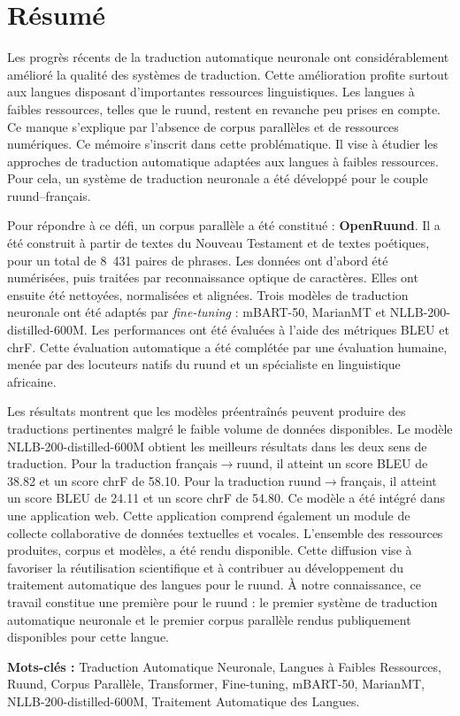 
\chapter*{Résumé}
Les progrès récents de la traduction automatique neuronale ont considérablement amélioré la qualité des systèmes de traduction. Cette amélioration profite surtout aux langues disposant d'importantes ressources linguistiques. Les langues à faibles ressources, telles que le ruund, restent en revanche peu prises en compte. Ce manque s'explique par l'absence de corpus parallèles et de ressources numériques. Ce mémoire s'inscrit dans cette problématique. Il vise à étudier les approches de traduction automatique adaptées aux langues à faibles ressources. Pour cela, un système de traduction neuronale a été développé pour le couple ruund–français.

Pour répondre à ce défi, un corpus parallèle a été constitué : \textbf{OpenRuund}. Il a été construit à partir de textes du Nouveau Testament et de textes poétiques, pour un total de 8~431 paires de phrases. Les données ont d'abord été numérisées, puis traitées par reconnaissance optique de caractères. Elles ont ensuite été nettoyées, normalisées et alignées. Trois modèles de traduction neuronale ont été adaptés par \textit{fine-tuning} : mBART-50, MarianMT et NLLB-200-distilled-600M. Les performances ont été évaluées à l'aide des métriques BLEU et chrF. Cette évaluation automatique a été complétée par une évaluation humaine, menée par des locuteurs natifs du ruund et un spécialiste en linguistique africaine.

Les résultats montrent que les modèles préentraînés peuvent produire des traductions pertinentes malgré le faible volume de données disponibles. Le modèle NLLB-200-distilled-600M obtient les meilleurs résultats dans les deux sens de traduction. Pour la traduction français$\rightarrow$ruund, il atteint un score BLEU de 38.82 et un score chrF de 58.10. Pour la traduction ruund$\rightarrow$français, il atteint un score BLEU de 24.11 et un score chrF de 54.80. Ce modèle a été intégré dans une application web. Cette application comprend également un module de collecte collaborative de données textuelles et vocales. L'ensemble des ressources produites, corpus et modèles, a été rendu disponible. Cette diffusion vise à favoriser la réutilisation scientifique et à contribuer au développement du traitement automatique des langues pour le ruund. À notre connaissance, ce travail constitue une première pour le ruund : le premier système de traduction automatique neuronale et le premier corpus parallèle rendus publiquement disponibles pour cette langue.

\vspace{6cm}
\textbf{Mots-clés :} Traduction Automatique Neuronale, Langues à Faibles Ressources, Ruund, Corpus Parallèle, Transformer, Fine-tuning, mBART-50, MarianMT, NLLB-200-distilled-600M, Traitement Automatique des Langues.